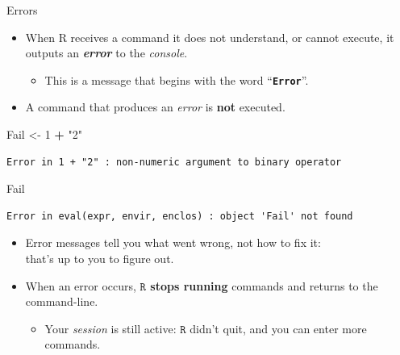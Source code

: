 \documentclass[
  11pt,
  ignorenonframetext,
]{beamer}
\newenvironment{Shaded}{\begin{snugshade}}{\end{snugshade}}
\newcommand{\DecValTok}[1]{\textcolor[rgb]{0.00,0.00,0.81}{#1}}
\newcommand{\ErrorTok}[1]{\textcolor[rgb]{0.64,0.00,0.00}{\textbf{#1}}}
\newcommand{\NormalTok}[1]{#1}
\newcommand{\OtherTok}[1]{\textcolor[rgb]{0.56,0.35,0.01}{#1}}
\newcommand{\SpecialCharTok}[1]{\textcolor[rgb]{0.81,0.36,0.00}{\textbf{#1}}}
\newcommand{\StringTok}[1]{\textcolor[rgb]{0.31,0.60,0.02}{#1}}
\providecommand{\tightlist}{%
  \setlength{\itemsep}{0pt}\setlength{\parskip}{0pt}}
\newcommand{\R}{\texttt{R}}
\begin{document}
\begin{frame}[fragile]{Errors}
\protect\hypertarget{errors}{}
\begin{itemize}
\tightlist
\item
  When R receives a command it does not understand, or cannot execute,
  it outputs an \textbf{\emph{error}} to the \emph{console}.

  \begin{itemize}
  \tightlist
  \item
    This is a message that begins with the word
    ``\ErrorTok{\texttt{Error}}''.
  \end{itemize}
\item
  A command that produces an \emph{error} is \textbf{not} executed.
\end{itemize}

\begin{Shaded}
\begin{Highlighting}[]
\NormalTok{Fail }\OtherTok{\textless{}{-}} \DecValTok{1} \SpecialCharTok{+} \StringTok{"2"}
\end{Highlighting}
\end{Shaded}

\begin{verbatim}
Error in 1 + "2" : non-numeric argument to binary operator
\end{verbatim}

\begin{Shaded}
\begin{Highlighting}[]
\NormalTok{Fail}
\end{Highlighting}
\end{Shaded}

\begin{verbatim}
Error in eval(expr, envir, enclos) : object 'Fail' not found
\end{verbatim}

\begin{itemize}
\tightlist
\item
  Error messages tell you what went wrong, not how to fix it:\\
  that's up to you to figure out.
\item
  When an error occurs, \textbf{\(\R\) stops running} commands and
  returns to the command-line.

  \begin{itemize}
  \tightlist
  \item
    Your \emph{session} is still active: \(\R\) didn't quit, and you can
    enter more commands.
  \end{itemize}
\end{itemize}
\end{frame}
\end{document}
